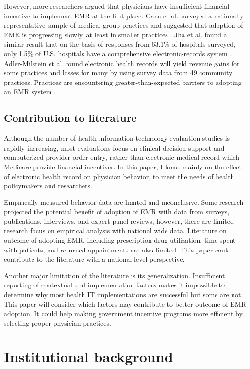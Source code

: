 However, more researchers argued that physicians have insufficient financial incentive to implement EMR at the first place. Gans et al. surveyed a nationally representative sample of medical group practices and suggested that adoption of EMR is progressing slowly, at least in smaller practices \citep{Gans2005}. Jha et al. found a similar result that on the basis of responses from 63.1\% of hospitals surveyed, only 1.5\% of U.S. hospitals have a comprehensive electronic-records system \citep{Jha2009}. Adler-Milstein et al. found electronic health records will yield revenue gains for some practices and losses for many by using survey data from 49 community practices. Practices are encountering greater-than-expected barriers to adopting an EMR system \citep{Adler-Milstein2012}.

\subsection{Contribution to literature}
Although the number of health information technology evaluation studies is rapidly increasing, most evaluations focus on clinical decision support and computerized provider order entry, rather than electronic medical record which Medicare provide financial incentives. In this paper, I focus mainly on the effect of electronic health record on physician behavior, to meet the needs of health policymakers and researchers.

Empirically measured behavior data are limited and inconclusive. Some research projected the potential benefit of adoption of EMR with data from surveys, publications, interviews, and expert-panel reviews, however, there are limited research focus on empirical analysis with national wide data. Literature on outcome of adopting EMR, including prescription drug utilization, time spent with patients, and returned appointments are also limited. This paper could contribute to the literature with a national-level perspective.

Another major limitation of the literature is its generalization. Insufficient reporting of contextual and implementation factors makes it impossible to determine why most health IT implementations are successful but some are not. This paper will consider which factors may contribute to better outcome of EMR adoption. It could help making government incentive programs more efficient by selecting proper physician practices.

\section{Institutional background}
